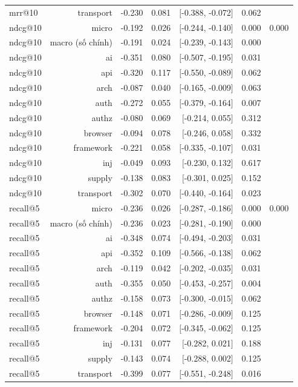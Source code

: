 \begin{table}[ht]
\begin{tabular}{lrrrrrr}
mrr@10 & transport & -0.230 & 0.081 & [-0.388, -0.072] & 0.062 &  \\
ndcg@10 & micro & -0.192 & 0.026 & [-0.244, -0.140] & 0.000 & 0.000 \\
ndcg@10 & macro (số chính) & -0.191 & 0.024 & [-0.239, -0.143] & 0.000 &  \\
ndcg@10 & ai & -0.351 & 0.080 & [-0.507, -0.195] & 0.031 &  \\
ndcg@10 & api & -0.320 & 0.117 & [-0.550, -0.089] & 0.062 &  \\
ndcg@10 & arch & -0.087 & 0.040 & [-0.165, -0.009] & 0.063 &  \\
ndcg@10 & auth & -0.272 & 0.055 & [-0.379, -0.164] & 0.007 &  \\
ndcg@10 & authz & -0.080 & 0.069 & [-0.214, 0.055] & 0.312 &  \\
ndcg@10 & browser & -0.094 & 0.078 & [-0.246, 0.058] & 0.332 &  \\
ndcg@10 & framework & -0.221 & 0.058 & [-0.335, -0.107] & 0.031 &  \\
ndcg@10 & inj & -0.049 & 0.093 & [-0.230, 0.132] & 0.617 &  \\
ndcg@10 & supply & -0.138 & 0.083 & [-0.301, 0.025] & 0.152 &  \\
ndcg@10 & transport & -0.302 & 0.070 & [-0.440, -0.164] & 0.023 &  \\
recall@5 & micro & -0.236 & 0.026 & [-0.287, -0.186] & 0.000 & 0.000 \\
recall@5 & macro (số chính) & -0.236 & 0.023 & [-0.281, -0.190] & 0.000 &  \\
recall@5 & ai & -0.348 & 0.074 & [-0.494, -0.203] & 0.031 &  \\
recall@5 & api & -0.352 & 0.109 & [-0.566, -0.138] & 0.062 &  \\
recall@5 & arch & -0.119 & 0.042 & [-0.202, -0.035] & 0.031 &  \\
recall@5 & auth & -0.355 & 0.050 & [-0.453, -0.257] & 0.004 &  \\
recall@5 & authz & -0.158 & 0.073 & [-0.300, -0.015] & 0.062 &  \\
recall@5 & browser & -0.148 & 0.071 & [-0.286, -0.009] & 0.125 &  \\
recall@5 & framework & -0.204 & 0.072 & [-0.345, -0.062] & 0.125 &  \\
recall@5 & inj & -0.131 & 0.077 & [-0.282, 0.021] & 0.188 &  \\
recall@5 & supply & -0.143 & 0.074 & [-0.288, 0.002] & 0.125 &  \\
recall@5 & transport & -0.399 & 0.077 & [-0.551, -0.248] & 0.016 &  \\

\end{tabular}
\end{table}
